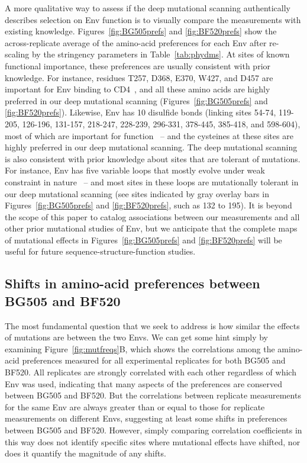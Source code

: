 \documentclass[9pt]{elife}
\begin{document}
A more qualitative way to assess if the deep mutational scanning authentically describes selection on Env function is to visually compare the measurements with existing knowledge.
Figures~\ref{fig:BG505prefs} and \ref{fig:BF520prefs} show the across-replicate average of the amino-acid preferences for each Env after re-scaling by the stringency parameters in Table~\ref{tab:phydms}.
At sites of known functional importance, these preferences are usually consistent with prior knowledge.
For instance, residues T257, D368, E370, W427, and D457 are important for Env binding to CD4~\citep{olshevsky1990identification}, and all these amino acids are highly preferred in our deep mutational scanning (Figures~\ref{fig:BG505prefs} and \ref{fig:BF520prefs}).
Likewise, Env has 10 disulfide bonds (linking sites 54-74, 119-205, 126-196, 131-157, 218-247, 228-239, 296-331, 378-445, 385-418, and 598-604), most of which are important for function~\citep{van2008only} -- and the cysteines at these sites are highly preferred in our deep mutational scanning.
The deep mutational scanning is also consistent with prior knowledge about sites that are tolerant of mutations.
For instance, Env has five variable loops that mostly evolve under weak constraint in nature~\citep{starcich1986identification,zolla2010structure} -- and most sites in these loops are mutationally tolerant in our deep mutational scanning (see sites indicated by gray overlay bars in Figures~\ref{fig:BG505prefs} and \ref{fig:BF520prefs}, such as 132 to 195).
It is beyond the scope of this paper to catalog associations between our measurements and all other prior mutational studies of Env, but we anticipate that the complete maps of mutational effects in Figures~\ref{fig:BG505prefs} and \ref{fig:BF520prefs} will be useful for future sequence-structure-function studies.

\subsection{Shifts in amino-acid preferences between BG505 and BF520}
The most fundamental question that we seek to address is how similar the effects of mutations are between the two Envs.
We can get some hint simply by examining Figure~\ref{fig:mutfreqs}B, which shows the correlations among the amino-acid preferences measured for all experimental replicates for both BG505 and BF520.
All replicates are strongly correlated with each other regardless of which Env was used, indicating that many aspects of the preferences are conserved between BG505 and BF520.
But the correlations between replicate measurements for the same Env are always greater than or equal to those for replicate measurements on different Envs, suggesting at least some shifts in preferences between BG505 and BF520.
However, simply comparing correlation coefficients in this way does not identify specific sites where mutational effects have shifted, nor does it quantify the magnitude of any shifts.
\end{document}
